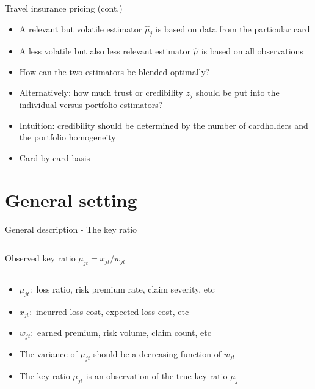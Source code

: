 \documentclass{beamer}
\begin{document}
\begin{frame}{Travel insurance pricing (cont.)}

\begin{itemize}
    \item A relevant but volatile estimator $\hat\mu_j$ is based on data from the particular card
    \item A less volatile but also less relevant estimator $\hat\mu$ is based on all observations
    \item How can the two estimators be blended optimally?
    \item Alternatively: how much trust or credibility $z_j$ should be put into the individual versus portfolio estimators?
    \item Intuition: credibility should be determined by the number of cardholders and the portfolio homogeneity
    \item Card by card basis
\end{itemize}
    
\end{frame}

\section{General setting}


\begin{frame}{General description - The key ratio}

\begin{columns}
    \begin{block}{Observed key ratio}
   $\mu_{jt} = x_{jt}/w_{jt}$
    \end{block}
\end{columns}

\vspace{0.5cm}
 
\begin{itemize}
    \item $\mu_{jt} \colon$ loss ratio, risk premium rate, claim severity, etc
    \item $x_{jt} \colon$ incurred loss cost, expected loss cost, etc
    \item $w_{jt} \colon$ earned premium, risk volume, claim count, etc
    \item The variance of $\mu_{jt}$ should be a decreasing function of $w_{jt}$
    \item The key ratio $\mu_{jt}$ is an observation of the true key ratio $\mu_j$
\end{itemize}

\end{frame}
\end{document}
